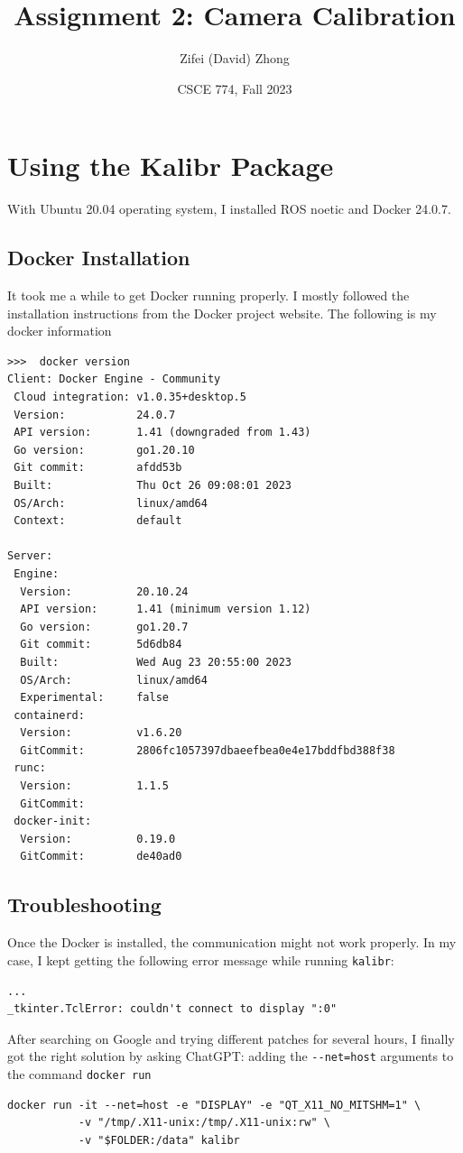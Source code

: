 \documentclass[11pt, oneside]{article}   	%
\title{Assignment 2: Camera Calibration}
\author{Zifei (David) Zhong}
\date{CSCE 774, Fall 2023}							%
\begin{document}
\maketitle

\section{Using the Kalibr Package}
With Ubuntu 20.04 operating system, I installed ROS noetic and Docker 24.0.7.

\subsection{Docker Installation}
It took me a while to get Docker running properly. I mostly followed the installation instructions from the Docker project website. The following is my docker information
\begin{verbatim}
>>>  docker version
Client: Docker Engine - Community
 Cloud integration: v1.0.35+desktop.5
 Version:           24.0.7
 API version:       1.41 (downgraded from 1.43)
 Go version:        go1.20.10
 Git commit:        afdd53b
 Built:             Thu Oct 26 09:08:01 2023
 OS/Arch:           linux/amd64
 Context:           default

Server:
 Engine:
  Version:          20.10.24
  API version:      1.41 (minimum version 1.12)
  Go version:       go1.20.7
  Git commit:       5d6db84
  Built:            Wed Aug 23 20:55:00 2023
  OS/Arch:          linux/amd64
  Experimental:     false
 containerd:
  Version:          v1.6.20
  GitCommit:        2806fc1057397dbaeefbea0e4e17bddfbd388f38
 runc:
  Version:          1.1.5
  GitCommit:        
 docker-init:
  Version:          0.19.0
  GitCommit:        de40ad0

\end{verbatim}

\subsection{Troubleshooting}
Once the Docker is installed, the communication might not work properly. In my case, I kept getting the following error message while running \verb+kalibr+:
\begin{verbatim}
...
_tkinter.TclError: couldn't connect to display ":0" 
\end{verbatim}

After searching on Google and trying different patches for several hours, I finally got the right solution by asking ChatGPT: adding the \verb+--net=host+ arguments to the command \verb+docker run+
\begin{verbatim}
docker run -it --net=host -e "DISPLAY" -e "QT_X11_NO_MITSHM=1" \
           -v "/tmp/.X11-unix:/tmp/.X11-unix:rw" \
           -v "$FOLDER:/data" kalibr
\end{verbatim}
\end{document}

